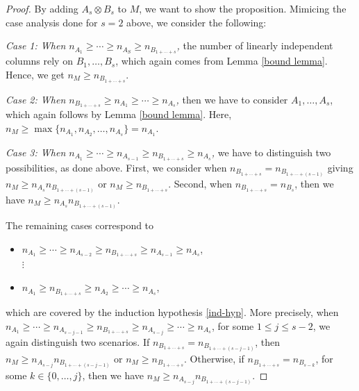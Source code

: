 \documentclass[10pt,a4paper]{amsart}
\begin{document}
\begin{proof}
By adding $A_s\otimes B_s$ to $M$, we want to show the proposition. Mimicing the case analysis done for $s=2$ above, we consider the following:

\emph{Case 1: When $n_{A_1}\geq \cdots\geq n_{A_S}\geq n_{B_{1+\cdots +s}}$,} the number of linearly independent columns rely on $B_1, \ldots, B_s$, which again comes from Lemma \ref{bound lemma}. Hence, we get $n_M\geq n_{B_{1+\cdots + s}}$.

\emph{Case 2: When $n_{B_{1+\cdots +s}}\geq n_{A_1}\geq \cdots\geq n_{A_s}$,} then we have to consider $A_1,\ldots,A_s$, which again follows by Lemma \ref{bound lemma}. Here, $n_M\geq\max\{n_{A_1},n_{A_2},\ldots, n_{A_s}\}=n_{A_1}$.

\emph{Case 3: When $n_{A_1}\geq \cdots \geq n_{A_{s-1}}\geq n_{B_{1+\cdots +s}}\geq n_{A_s}$,} we have to distinguish two possibilities, as done above. First, we consider when $n_{B_{1+\cdots +s}}=n_{B_{1+\cdots +(s-1)}}$ giving $n_M\geq n_{A_s} n_{B_{1+\cdots +(s-1)}}$ or  $n_M\geq n_{B_{1+\cdots +s}}$. Second, when $n_{B_{1+\cdots +s}}=n_{B_s}$, then we have $n_M\geq n_{A_s} n_{B_{1+\cdots +(s-1)}}$.

The remaining cases correspond to
\begin{itemize}
\item $n_{A_1}\geq \cdots \geq n_{A_{s-2}}\geq n_{B_{1+\cdots +s}}\geq n_{A_{s-1}}\geq n_{A_s}$,\\
 $\vdots$
\item $ n_{A_1}\geq n_{B_{1+\cdots +s}}\geq n_{A_2}\geq \cdots \geq n_{A_s}$,
\end{itemize}
which are covered by the induction hypothesis \eqref{ind-hyp}. More precisely, when $n_{A_1}\geq \cdots \geq n_{A_{s-j-1}}\geq n_{B_{1+\cdots +s}}\geq n_{A_{s-j}}\geq \cdots \geq n_{A_s}$, for some $1\leq j \leq s-2$, we again distinguish two scenarios. If $n_{B_{1+\cdots +s}}=n_{B_{1+\cdots +(s-j-1)}}$, then $n_M\geq n_{A_{s-j}} n_{B_{1+\cdots +(s-j-1)}}$ or  $n_M\geq n_{B_{1+\cdots +s}}$. Otherwise, if $n_{B_{1+\cdots +s}}=n_{B_{s-k}}$, for some $k\in\{0,\ldots, j\}$, then we have $n_M\geq n_{A_{s-j}} n_{B_{1+\cdots +(s-j-1)}}$.
\end{proof}
\end{document}
